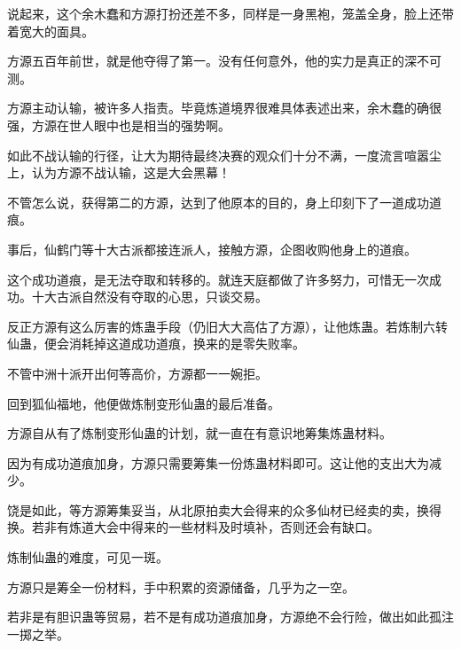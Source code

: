 \begin{this_body}
说起来，这个余木蠢和方源打扮还差不多，同样是一身黑袍，笼盖全身，脸上还带着宽大的面具。

方源五百年前世，就是他夺得了第一。没有任何意外，他的实力是真正的深不可测。

方源主动认输，被许多人指责。毕竟炼道境界很难具体表述出来，余木蠢的确很强，方源在世人眼中也是相当的强势啊。

如此不战认输的行径，让大为期待最终决赛的观众们十分不满，一度流言喧嚣尘上，认为方源不战认输，这是大会黑幕！

不管怎么说，获得第二的方源，达到了他原本的目的，身上印刻下了一道成功道痕。

事后，仙鹤门等十大古派都接连派人，接触方源，企图收购他身上的道痕。

这个成功道痕，是无法夺取和转移的。就连天庭都做了许多努力，可惜无一次成功。十大古派自然没有夺取的心思，只谈交易。

反正方源有这么厉害的炼蛊手段（仍旧大大高估了方源），让他炼蛊。若炼制六转仙蛊，便会消耗掉这道成功道痕，换来的是零失败率。

不管中洲十派开出何等高价，方源都一一婉拒。

回到狐仙福地，他便做炼制变形仙蛊的最后准备。

方源自从有了炼制变形仙蛊的计划，就一直在有意识地筹集炼蛊材料。

因为有成功道痕加身，方源只需要筹集一份炼蛊材料即可。这让他的支出大为减少。

饶是如此，等方源筹集妥当，从北原拍卖大会得来的众多仙材已经卖的卖，换得换。若非有炼道大会中得来的一些材料及时填补，否则还会有缺口。

炼制仙蛊的难度，可见一斑。

方源只是筹全一份材料，手中积累的资源储备，几乎为之一空。

若非是有胆识蛊等贸易，若不是有成功道痕加身，方源绝不会行险，做出如此孤注一掷之举。

\end{this_body}

